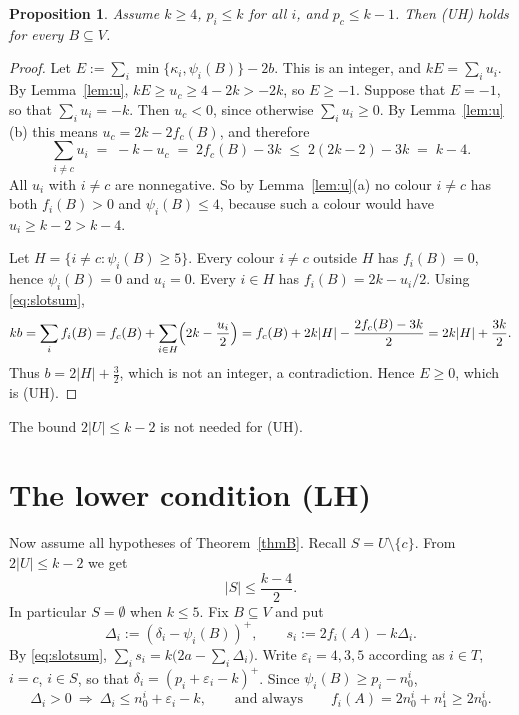 \documentclass[11pt]{amsart}
\newtheorem{proposition}[theorem]{Proposition}
\theoremstyle{definition}
\theoremstyle{remark}
\newcommand{\pos}[1]{\left(#1\right)^{+}}
\begin{document}
\begin{proposition}\label{prop:UH}
Assume $k\ge4$, $p_i\le k$ for all $i$, and $p_c\le k-1$. Then \textup{(UH)} holds for every
$B\subseteq V$.
\end{proposition}

\begin{proof}
Let $E:=\sum_i\min\{\kappa_i,\psi_i(B)\}-2b$. This is an integer, and $kE=\sum_iu_i$. By
Lemma~\ref{lem:u}, $kE\ge u_c\ge 4-2k>-2k$, so $E\ge-1$. Suppose that $E=-1$, so that
$\sum_iu_i=-k$. Then $u_c<0$, since otherwise $\sum_i u_i\ge0$. By Lemma~\ref{lem:u}(b) this
means $u_c=2k-2f_c(B)$, and therefore
\[
\sum_{i\ne c}u_i\;=\;-k-u_c\;=\;2f_c(B)-3k\;\le\;2(2k-2)-3k\;=\;k-4 .
\]
All $u_i$ with $i\ne c$ are nonnegative. So by Lemma~\ref{lem:u}(a) no colour $i\ne c$ has both
$f_i(B)>0$ and $\psi_i(B)\le4$, because such a colour would have $u_i\ge k-2>k-4$.

Let $H=\{i\ne c:\psi_i(B)\ge5\}$. Every colour $i\ne c$ outside $H$ has $f_i(B)=0$, hence
$\psi_i(B)=0$ and $u_i=0$. Every $i\in H$ has $f_i(B)=2k-u_i/2$. Using \eqref{eq:slotsum},
\[
kb=\sum_if_i(B)=f_c(B)+\sum_{i\in H}\Bigl(2k-\frac{u_i}{2}\Bigr)
=f_c(B)+2k|H|-\frac{2f_c(B)-3k}{2}=2k|H|+\frac{3k}{2}.
\]
Thus $b=2|H|+\tfrac32$, which is not an integer, a contradiction. Hence $E\ge0$, which is (UH).
\end{proof}

The bound $2|U|\le k-2$ is not needed for (UH).

\section{The lower condition (LH)}\label{sec:lower}

Now assume all hypotheses of Theorem~\ref{thmB}. Recall $S=U\setminus\{c\}$. From
$2|U|\le k-2$ we get
\begin{equation}\label{eq:Sbound}
|S|\le\frac{k-4}{2}.
\end{equation}
In particular $S=\emptyset$ when $k\le5$. Fix $B\subseteq V$ and put
\[
\Delta_i:=\pos{\delta_i-\psi_i(B)},\qquad s_i:=2f_i(A)-k\Delta_i .
\]
By \eqref{eq:slotsum}, $\sum_is_i=k\bigl(2a-\sum_i\Delta_i\bigr)$. Write
$\varepsilon_i=4,3,5$ according as $i\in T$, $i=c$, $i\in S$, so that
$\delta_i=\pos{p_i+\varepsilon_i-k}$. Since $\psi_i(B)\ge p_i-n_0^i$,
\begin{equation}\label{eq:Delta}
\Delta_i>0\ \Longrightarrow\ \Delta_i\le n_0^i+\varepsilon_i-k,
\qquad\text{and always}\qquad f_i(A)=2n_0^i+n_1^i\ge 2n_0^i .
\end{equation}
\end{document}
